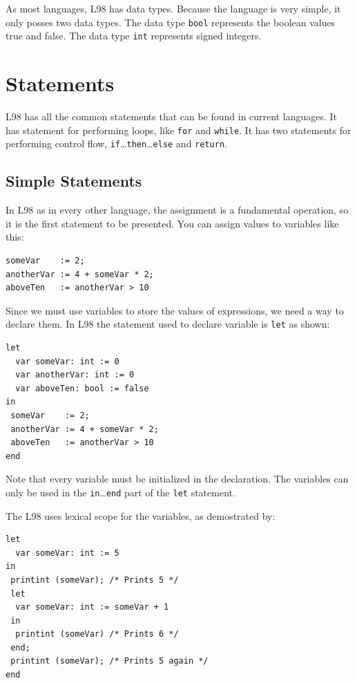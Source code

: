 \documentclass[a4paper, 11pt]{report}
\newcommand{\keyword}[1]{\texttt{#1}}
\begin{document}
As most languages, L98 has data types. Because the language is very simple, it
only posses two data types. The data type \keyword{bool} represents the boolean
values true and false. The data type \keyword{int} represents signed integers.

\section{Statements}

L98 has all the common statements that can be found in current
languages. It has statement for performing loops, like \keyword{for}
and \keyword{while}. It has two statements for performing control
flow, \keyword{if}\dots\keyword{then}\dots\keyword{else} and
\keyword{return}.

\subsection{Simple Statements}

In L98 as in every other language, the assignment is a fundamental
operation, so it is the first statement to be presented. You can assign
values to variables like this:

\begin{lstlisting}
someVar    := 2;
anotherVar := 4 + someVar * 2;
aboveTen   := anotherVar > 10
\end{lstlisting}

Since we must use variables to store the values of expressions, we
need a way to declare them. In L98 the statement used to declare
variable is \keyword{let} as shown:

\begin{lstlisting}
let
  var someVar: int := 0
  var anotherVar: int := 0
  var aboveTen: bool := false
in
 someVar    := 2;
 anotherVar := 4 + someVar * 2;
 aboveTen   := anotherVar > 10
end
\end{lstlisting}

Note that every variable must be initialized in the declaration. The
variables can only be used in the \keyword{in}\dots\keyword{end} part
of the \keyword{let} statement.

The L98 uses lexical scope for the variables, as demostrated by:

\begin{lstlisting}
let
  var someVar: int := 5
in
 printint (someVar); /* Prints 5 */
 let
  var someVar: int := someVar + 1
 in
  printint (someVar) /* Prints 6 */
 end;
 printint (someVar); /* Prints 5 again */
end
\end{lstlisting}
\end{document}
